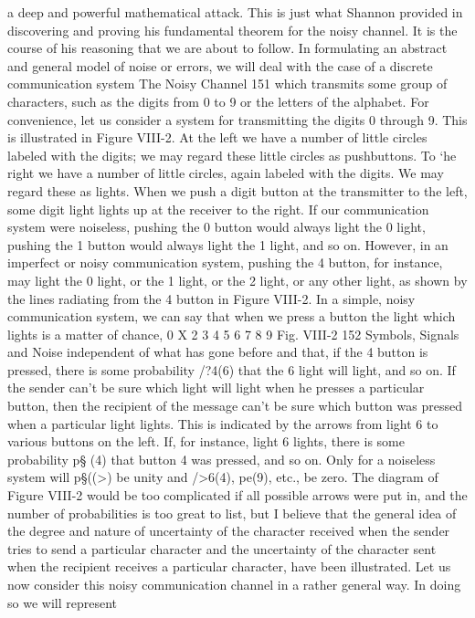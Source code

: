 {{{a deep and powerful mathematical attack. This is just what Shannon
provided in discovering and proving his fundamental theorem
for the noisy channel. It is the course of his reasoning that we are
about to follow.
In formulating an abstract and general model of noise or errors,
we will deal with the case of a discrete communication system
The Noisy Channel
151
which transmits some group of characters, such as the digits from
0 to 9 or the letters of the alphabet. For convenience, let us consider
a system for transmitting the digits 0 through 9. This is illustrated
in Figure VIII-2. At the left we have a number of little circles
labeled with the digits; we may regard these little circles as pushbuttons.
To ‘he right we have a number of little circles, again
labeled with the digits. We may regard these as lights. When we
push a digit button at the transmitter to the left, some digit light
lights up at the receiver to the right.
If our communication system were noiseless, pushing the 0
button would always light the 0 light, pushing the 1 button would
always light the 1 light, and so on. However, in an imperfect or
noisy communication system, pushing the 4 button, for instance,
may light the 0 light, or the 1 light, or the 2 light, or any other light,
as shown by the lines radiating from the 4 button in Figure VIII-2.
In a simple, noisy communication system, we can say that when
we press a button the light which lights is a matter of chance,
0
X
2
3
4
5
6
7
8
9
Fig. VIII-2
152
Symbols, Signals and Noise
independent of what has gone before and that, if the 4 button is
pressed, there is some probability /?4(6) that the 6 light will light,
and so on.
If the sender can’t be sure which light will light when he presses
a particular button, then the recipient of the message can’t be sure
which button was pressed when a particular light lights. This is
indicated by the arrows from light 6 to various buttons on the left.
If, for instance, light 6 lights, there is some probability p§ (4) that
button 4 was pressed, and so on. Only for a noiseless system will
p§((>) be unity and />6(4), pe(9), etc., be zero.
The diagram of Figure VIII-2 would be too complicated if all
possible arrows were put in, and the number of probabilities is too
great to list, but I believe that the general idea of the degree and
nature of uncertainty of the character received when the sender
tries to send a particular character and the uncertainty of the
character sent when the recipient receives a particular character,
have been illustrated. Let us now consider this noisy communication
channel in a rather general way. In doing so we will represent
}}}
